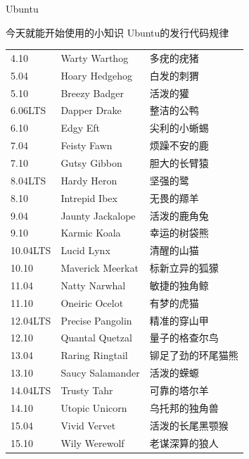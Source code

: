 \documentclass{beamer}
\let\oldfootnotesize\footnotesize
\renewcommand*{\footnotesize}{\oldfootnotesize\tiny}
\begin{document}
\begin{frame}[t]{Ubuntu}
	\begin{block}
		{今天就能开始使用的小知识}
		Ubuntu的发行代码规律

		\footnotesize
		\begin{tabular}{lll}
4.10     	&  Warty Warthog         	&  多疣的疣猪         	\\
5.04     	&  Hoary Hedgehog        	&  白发的刺猬         	\\
5.10     	&  Breezy Badger         	&  活泼的獾           	\\
6.06LTS  	&  Dapper Drake          	&  整洁的公鸭         	\\
6.10     	&  Edgy Eft              	&  尖利的小蜥蜴       	\\
7.04     	&  Feisty Fawn           	&  烦躁不安的鹿       	\\
7.10     	&  Gutsy Gibbon          	&  胆大的长臂猿       	\\
8.04LTS  	&  Hardy Heron           	&  坚强的鹭           	\\
8.10     	&  Intrepid Ibex         	&  无畏的羱羊         	\\
9.04     	&  Jaunty Jackalope      	&  活泼的鹿角兔       	\\
9.10     	&  Karmic Koala          	&  幸运的树袋熊       	\\
10.04LTS 	&  Lucid Lynx            	&  清醒的山猫         	\\
10.10    	&  Maverick Meerkat      	&  标新立异的狐獴     	\\
11.04    	&  Natty Narwhal         	&  敏捷的独角鲸       	\\
11.10    	&  Oneiric Ocelot        	&  有梦的虎猫         	\\
12.04LTS 	&  Precise Pangolin      	&  精准的穿山甲       	\\
12.10    	&  Quantal Quetzal       	&  量子的格查尔鸟     	\\
13.04    	&  Raring Ringtail       	&  铆足了劲的环尾猫熊 	\\
13.10    	&  Saucy Salamander      	&  活泼的蝾螈         	\\
14.04LTS  & Trusty Tahr       & 可靠的塔尔羊       \\
14.10     & Utopic Unicorn    & 乌托邦的独角兽     \\
15.04     & Vivid Vervet      & 活泼的长尾黑颚猴   \\
15.10     & Wily Werewolf     & 老谋深算的狼人     \\
\end{tabular}
\end{block}
\end{frame}
\end{document}
